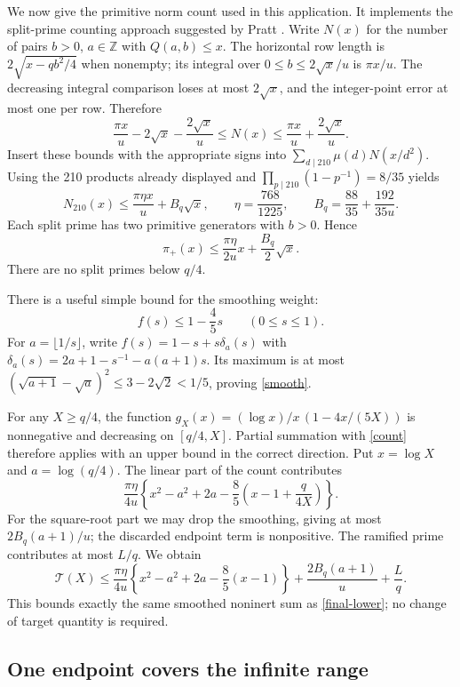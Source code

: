 \documentclass[11pt]{article}
\newcommand{\Tn}{\mathcal T}
\begin{document}
We now give the primitive norm count used in this application.
It implements the split-prime counting approach suggested by Pratt
\cite{pratt}. Write $N(x)$ for the number of pairs
$b>0$, $a\in\mathbb Z$ with $Q(a,b)\le x$.
The horizontal row length is \(2\sqrt{x-qb^2/4}\) when nonempty;
its integral over \(0\le b\le2\sqrt x/u\) is \(\pi x/u\).
The decreasing integral comparison loses at most \(2\sqrt x\),
and the integer-point error at most one per row. Therefore
\[
 \frac{\pi x}{u}-2\sqrt x-\frac{2\sqrt x}{u}
 \le N(x)\le\frac{\pi x}{u}+\frac{2\sqrt x}{u}.
\]
Insert these bounds with the appropriate signs into
$\sum_{d\mid210}\mu(d)N(x/d^2)$. Using the 210 products already
displayed and $\prod_{p\mid210}(1-p^{-1})=8/35$ yields
\[
 N_{210}(x)\le\frac{\pi\eta x}{u}+B_q\sqrt x,
 \qquad \eta=\frac{768}{1225},\qquad
 B_q=\frac{88}{35}+\frac{192}{35u}.
\]
Each split prime has two primitive generators with $b>0$. Hence
\begin{equation}\label{count}
 \pi_+(x)\le\frac{\pi\eta}{2u}x+\frac{B_q}{2}\sqrt x.
\end{equation}
There are no split primes below $q/4$.

There is a useful simple bound for the smoothing weight:
\begin{equation}\label{smooth}
 f(s)\le1-\frac45s\qquad(0\le s\le1).
\end{equation}
For $a=\lfloor1/s\rfloor$, write
$f(s)=1-s+s\delta_a(s)$ with
$\delta_a(s)=2a+1-s^{-1}-a(a+1)s$.
Its maximum is at most
$(\sqrt{a+1}-\sqrt a)^2\le3-2\sqrt2<1/5$, proving
\eqref{smooth}.

For any $X\ge q/4$, the function
$g_X(x)=(\log x)/x\,(1-4x/(5X))$ is nonnegative and decreasing
on $[q/4,X]$. Partial summation with \eqref{count} therefore applies
with an upper bound in the correct direction. Put $x=\log X$ and
$a=\log(q/4)$. The linear part of the count contributes
\[
 \frac{\pi\eta}{4u}
 \left\{x^2-a^2+2a-\frac85\left(x-1+\frac{q}{4X}\right)\right\}.
\]
For the square-root part we may drop the smoothing, giving at most
$2B_q(a+1)/u$; the discarded endpoint term is nonpositive.
The ramified prime contributes at most $L/q$. We obtain
\begin{equation}\label{norm-upper}
 \Tn(X)\le\frac{\pi\eta}{4u}
   \left\{x^2-a^2+2a-\frac85(x-1)\right\}
       +\frac{2B_q(a+1)}u+\frac Lq.
\end{equation}
This bounds exactly the same smoothed noninert sum as
\eqref{final-lower}; no change of target quantity is required.

\subsection{One endpoint covers the infinite range}
\end{document}
